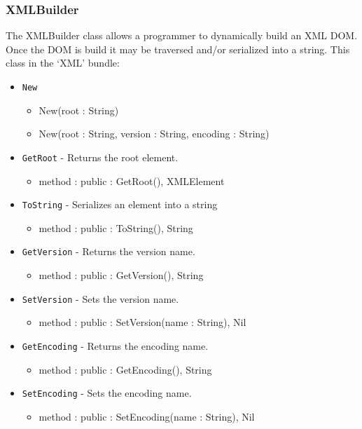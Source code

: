 \documentclass[12pt]{article}
\begin{document}
\subsubsection{XMLBuilder}
The XMLBuilder class allows a programmer to dynamically build an XML
DOM.  Once the DOM is build it may be traversed and/or serialized into
a string. This class in the `XML' bundle:
\begin{itemize}
\item \texttt{New}
  \begin{itemize}
  \item New(root : String)
  \item New(root : String, version : String, encoding : String)
  \end{itemize}
\item \texttt{GetRoot} - Returns the root element.
  \begin{itemize}
  \item method : public : GetRoot(), XMLElement
  \end{itemize}
\item \texttt{ToString} - Serializes an element into a string
  \begin{itemize}
  \item method : public : ToString(), String
  \end{itemize}
\item \texttt{GetVersion} - Returns the version name.
  \begin{itemize}
  \item method : public : GetVersion(), String
  \end{itemize}
\item \texttt{SetVersion} - Sets the version name.
  \begin{itemize}
  \item method : public : SetVersion(name : String), Nil
  \end{itemize}
\item \texttt{GetEncoding} - Returns the encoding name.
  \begin{itemize}
  \item method : public : GetEncoding(), String
  \end{itemize}
\item \texttt{SetEncoding} - Sets the encoding name.
  \begin{itemize}
  \item method : public : SetEncoding(name : String), Nil
  \end{itemize}
\end{itemize}
\end{document}
